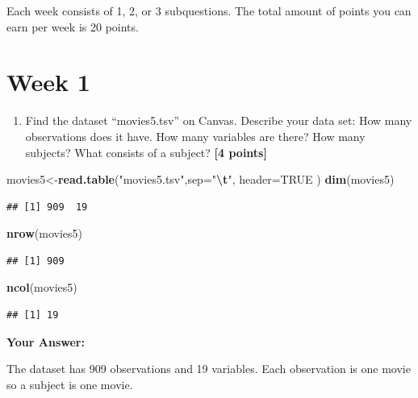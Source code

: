\documentclass[
]{article}
\newenvironment{Shaded}{\begin{snugshade}}{\end{snugshade}}
\newcommand{\AttributeTok}[1]{\textcolor[rgb]{0.13,0.29,0.53}{#1}}
\newcommand{\ConstantTok}[1]{\textcolor[rgb]{0.56,0.35,0.01}{#1}}
\newcommand{\FunctionTok}[1]{\textcolor[rgb]{0.13,0.29,0.53}{\textbf{#1}}}
\newcommand{\NormalTok}[1]{#1}
\newcommand{\OtherTok}[1]{\textcolor[rgb]{0.56,0.35,0.01}{#1}}
\newcommand{\SpecialCharTok}[1]{\textcolor[rgb]{0.81,0.36,0.00}{\textbf{#1}}}
\newcommand{\StringTok}[1]{\textcolor[rgb]{0.31,0.60,0.02}{#1}}
\providecommand{\tightlist}{%
  \setlength{\itemsep}{0pt}\setlength{\parskip}{0pt}}
\begin{document}
Each week consists of 1, 2, or 3 subquestions. The total amount of
points you can earn per week is 20 points.

\section{Week 1}\label{week-1}

\begin{enumerate}
\def\labelenumi{\arabic{enumi}.}
\tightlist
\item
  Find the dataset ``movies5.tsv'' on Canvas. Describe your data set:
  How many observations does it have. How many variables are there? How
  many subjects? What consists of a subject? \textbf{[4 points]}
\end{enumerate}

\begin{Shaded}
\begin{Highlighting}[]
\NormalTok{movies5}\OtherTok{\textless{}{-}}\FunctionTok{read.table}\NormalTok{(}\StringTok{"movies5.tsv"}\NormalTok{,}\AttributeTok{sep=}\StringTok{"}\SpecialCharTok{\textbackslash{}t}\StringTok{"}\NormalTok{, }\AttributeTok{header=}\ConstantTok{TRUE}\NormalTok{ )}
\FunctionTok{dim}\NormalTok{(movies5)}
\end{Highlighting}
\end{Shaded}

\begin{verbatim}
## [1] 909  19
\end{verbatim}

\begin{Shaded}
\begin{Highlighting}[]
\FunctionTok{nrow}\NormalTok{(movies5)}
\end{Highlighting}
\end{Shaded}

\begin{verbatim}
## [1] 909
\end{verbatim}

\begin{Shaded}
\begin{Highlighting}[]
\FunctionTok{ncol}\NormalTok{(movies5)}
\end{Highlighting}
\end{Shaded}

\begin{verbatim}
## [1] 19
\end{verbatim}

\textbf{Your Answer:}

The dataset has 909 observations and 19 variables. Each observation is
one movie so a subject is one movie.
\end{document}
